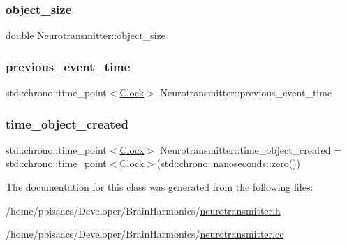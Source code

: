 \subsubsection{\texorpdfstring{object\+\_\+size}{object\_size}}
{\footnotesize\ttfamily double Neurotransmitter\+::object\+\_\+size\hspace{0.3cm}{\ttfamily [private]}}

\mbox{\label{classNeurotransmitter_a47efa9a5481fae796df7f1020a15e2f2}} 
\subsubsection{\texorpdfstring{previous\+\_\+event\+\_\+time}{previous\_event\_time}}
{\footnotesize\ttfamily std\+::chrono\+::time\+\_\+point$<$\mbox{\hyperlink{universe_8h_a0ef8d951d1ca5ab3cfaf7ab4c7a6fd80}{Clock}}$>$ Neurotransmitter\+::previous\+\_\+event\+\_\+time\hspace{0.3cm}{\ttfamily [private]}}

\mbox{\label{classNeurotransmitter_acad5444f7486ee9c2d3bff1b6b3f59ad}} 
\subsubsection{\texorpdfstring{time\+\_\+object\+\_\+created}{time\_object\_created}}
{\footnotesize\ttfamily std\+::chrono\+::time\+\_\+point$<$\mbox{\hyperlink{universe_8h_a0ef8d951d1ca5ab3cfaf7ab4c7a6fd80}{Clock}}$>$ Neurotransmitter\+::time\+\_\+object\+\_\+created = std\+::chrono\+::time\+\_\+point$<$\mbox{\hyperlink{universe_8h_a0ef8d951d1ca5ab3cfaf7ab4c7a6fd80}{Clock}}$>$(std\+::chrono\+::nanoseconds\+::zero())\hspace{0.3cm}{\ttfamily [private]}}



The documentation for this class was generated from the following files\+:\begin{DoxyCompactItemize}
\item 
/home/pbisaacs/\+Developer/\+Brain\+Harmonics/\mbox{\hyperlink{neurotransmitter_8h}{neurotransmitter.\+h}}\item 
/home/pbisaacs/\+Developer/\+Brain\+Harmonics/\mbox{\hyperlink{neurotransmitter_8cc}{neurotransmitter.\+cc}}\end{DoxyCompactItemize}

